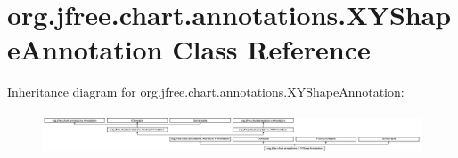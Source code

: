 \hypertarget{classorg_1_1jfree_1_1chart_1_1annotations_1_1_x_y_shape_annotation}{}\section{org.\+jfree.\+chart.\+annotations.\+X\+Y\+Shape\+Annotation Class Reference}
\label{classorg_1_1jfree_1_1chart_1_1annotations_1_1_x_y_shape_annotation}
Inheritance diagram for org.\+jfree.\+chart.\+annotations.\+X\+Y\+Shape\+Annotation\+:\begin{figure}[H]
\begin{center}
\leavevmode
\includegraphics[height=1.248607cm]{classorg_1_1jfree_1_1chart_1_1annotations_1_1_x_y_shape_annotation}
\end{center}
\end{figure}
